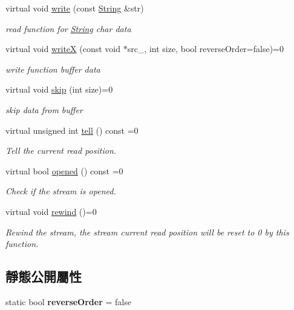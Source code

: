 \begin{DoxyCompactItemize}
virtual void \hyperlink{class_i_dream_sky_1_1_output_stream_ad94eecac88f3a210a98b2765b46cfb35}{write} (const \hyperlink{class_i_dream_sky_1_1_string}{String} \&str)
\begin{DoxyCompactList}\small\item\em read function for \hyperlink{class_i_dream_sky_1_1_string}{String} char data \end{DoxyCompactList}\item 
virtual void \hyperlink{class_i_dream_sky_1_1_output_stream_ae79fd5ab1935901e021f64ab0da4dbf0}{writeX} (const void $\ast$src\+\_\+, int size, bool reverse\+Order=false)=0
\begin{DoxyCompactList}\small\item\em write function buffer data \end{DoxyCompactList}\item 
virtual void \hyperlink{class_i_dream_sky_1_1_output_stream_ad2e8b521f90af7c57620040b47961a50}{skip} (int size)=0
\begin{DoxyCompactList}\small\item\em skip data from buffer \end{DoxyCompactList}\item 
virtual unsigned int \hyperlink{class_i_dream_sky_1_1_output_stream_ac64e26bd7c453af494839b19c145e322}{tell} () const  =0
\begin{DoxyCompactList}\small\item\em Tell the current read position. \end{DoxyCompactList}\item 
virtual bool \hyperlink{class_i_dream_sky_1_1_output_stream_acaf486766730cc13bd9caa1122cee4b8}{opened} () const  =0
\begin{DoxyCompactList}\small\item\em Check if the stream is opened. \end{DoxyCompactList}\item 
virtual void \hyperlink{class_i_dream_sky_1_1_output_stream_aecbf1cf82e7fbc35e0b231231daf9959}{rewind} ()=0
\begin{DoxyCompactList}\small\item\em Rewind the stream, the stream current read position will be reset to 0 by this function. \end{DoxyCompactList}\end{DoxyCompactItemize}
\subsection*{靜態公開屬性}
\begin{DoxyCompactItemize}
\item 
static bool {\bfseries reverse\+Order} = false\hypertarget{class_i_dream_sky_1_1_output_stream_a587cd9a315f6a56a4d7297acfa74d043}{}\label{class_i_dream_sky_1_1_output_stream_a587cd9a315f6a56a4d7297acfa74d043}

\end{DoxyCompactItemize}


